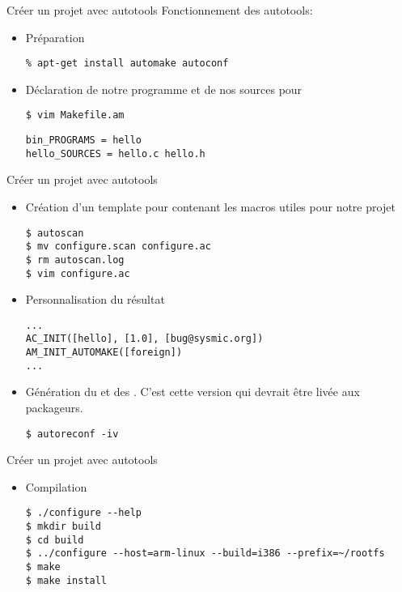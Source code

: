 \begin{frame}[fragile=singleslide]{Créer un projet avec autotools}
  Fonctionnement des autotools:
  \begin{itemize}
  \item Préparation
\begin{lstlisting}
% apt-get install automake autoconf
\end{lstlisting}
  \item Déclaration de notre programme et de nos sources pour 
\begin{lstlisting}
$ vim Makefile.am
\end{lstlisting} %
\begin{lstlisting}
bin_PROGRAMS = hello
hello_SOURCES = hello.c hello.h
\end{lstlisting}
  \end{itemize}
\end{frame}

\begin{frame}[fragile=singleslide]{Créer un projet avec autotools}
  \begin{itemize}
  \item  Création  d'un  template  pour   contenant  les
    macros utiles pour notre projet
\begin{lstlisting}
$ autoscan
$ mv configure.scan configure.ac
$ rm autoscan.log
$ vim configure.ac
\end{lstlisting}
  \item Personnalisation du résultat
\begin{lstlisting}
...
AC_INIT([hello], [1.0], [bug@sysmic.org])
AM_INIT_AUTOMAKE([foreign])
...
\end{lstlisting}
  \item      Génération      du            et      des
    . C'est cette version qui devrait être livée aux
    packageurs.
\begin{lstlisting}
$ autoreconf -iv
\end{lstlisting} %
  \end{itemize}
\end{frame}

\begin{frame}[fragile=singleslide]{Créer un projet avec autotools}
  \begin{itemize}
  \item Compilation
\begin{lstlisting}
$ ./configure --help
$ mkdir build
$ cd build
$ ../configure --host=arm-linux --build=i386 --prefix=~/rootfs
$ make
$ make install
\end{lstlisting} %
  \end{itemize}
\end{frame}

